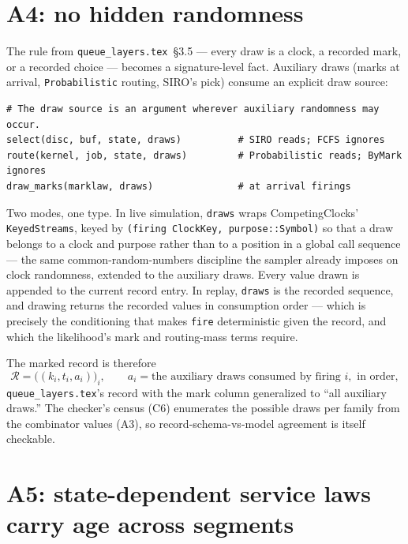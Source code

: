 \documentclass[11pt]{article}
\newcommand{\code}[1]{\texttt{#1}}
\begin{document}
\section{A4: no hidden randomness}
\label{sec:a4}

The rule from \code{queue\_layers.tex}~\S3.5 --- every draw is a clock, a
recorded mark, or a recorded choice --- becomes a signature-level fact.
Auxiliary draws (marks at arrival, \code{Probabilistic} routing, SIRO's
pick) consume an explicit draw source:

\begin{lstlisting}
# The draw source is an argument wherever auxiliary randomness may occur.
select(disc, buf, state, draws)          # SIRO reads; FCFS ignores
route(kernel, job, state, draws)         # Probabilistic reads; ByMark ignores
draw_marks(marklaw, draws)               # at arrival firings
\end{lstlisting}

Two modes, one type. In live simulation, \code{draws} wraps
CompetingClocks' \code{KeyedStreams}, keyed by
\code{(firing ClockKey, purpose::Symbol)} so that a draw belongs to a clock
and purpose rather than to a position in a global call sequence --- the
same common-random-numbers discipline the sampler already imposes on clock
randomness, extended to the auxiliary draws. Every value drawn is appended
to the current record entry. In replay, \code{draws} is the recorded
sequence, and drawing returns the recorded values in consumption order ---
which is precisely the conditioning that makes \code{fire} deterministic
given the record, and which the likelihood's mark and routing-mass terms
require.

The marked record is therefore
\[
\mathcal{R} = \big( (k_i, t_i, a_i) \big)_{i},
\qquad a_i = \text{the auxiliary draws consumed by firing } i,
\text{ in order},
\]
\code{queue\_layers.tex}'s record with the mark column generalized to
``all auxiliary draws.'' The checker's census (C6) enumerates the possible
draws per family from the combinator values (A3), so
record-schema-vs-model agreement is itself checkable.

\section{A5: state-dependent service laws carry age across segments}
\label{sec:a5}
\end{document}
